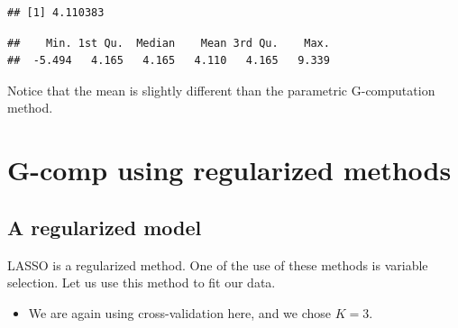 \documentclass[
]{book}
\newenvironment{Shaded}{\begin{snugshade}}{\end{snugshade}}
\newcommand{\AttributeTok}[1]{\textcolor[rgb]{0.77,0.63,0.00}{#1}}
\newcommand{\ConstantTok}[1]{\textcolor[rgb]{0.00,0.00,0.00}{#1}}
\newcommand{\DecValTok}[1]{\textcolor[rgb]{0.00,0.00,0.81}{#1}}
\newcommand{\FunctionTok}[1]{\textcolor[rgb]{0.00,0.00,0.00}{#1}}
\newcommand{\NormalTok}[1]{#1}
\newcommand{\OtherTok}[1]{\textcolor[rgb]{0.56,0.35,0.01}{#1}}
\newcommand{\SpecialCharTok}[1]{\textcolor[rgb]{0.00,0.00,0.00}{#1}}
\providecommand{\tightlist}{%
  \setlength{\itemsep}{0pt}\setlength{\parskip}{0pt}}
\begin{document}
\begin{verbatim}
## [1] 4.110383
\end{verbatim}

\begin{Shaded}
\end{Shaded}

\begin{verbatim}
##    Min. 1st Qu.  Median    Mean 3rd Qu.    Max. 
##  -5.494   4.165   4.165   4.110   4.165   9.339
\end{verbatim}

Notice that the mean is slightly different than the parametric G-computation method.

\hypertarget{g-comp-using-regularized-methods}{%
\section{G-comp using regularized methods}\label{g-comp-using-regularized-methods}}

\hypertarget{a-regularized-model}{%
\subsection{A regularized model}\label{a-regularized-model}}

LASSO is a regularized method. One of the use of these methods is variable selection. Let us use this method to fit our data.

\begin{itemize}
\tightlist
\item
  We are again using cross-validation here, and we chose \(K=3\).
\end{itemize}

\begin{Shaded}
\end{Shaded}
\end{document}
